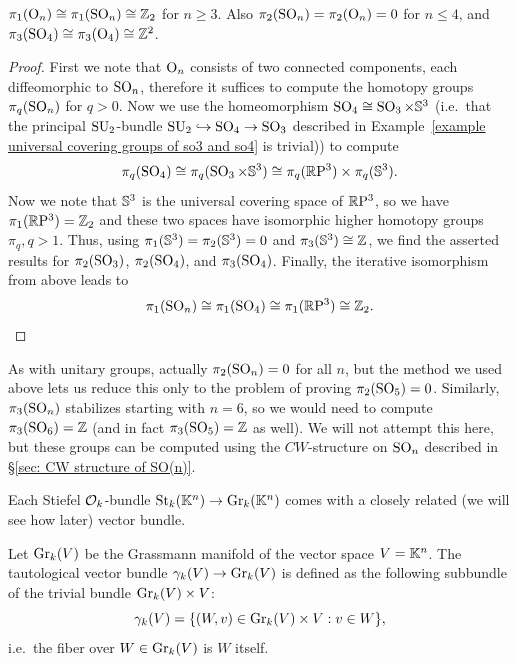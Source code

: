 \begin{cor}
    $\pi_1(\operatorname{O}_n)\cong \pi_1(\operatorname{SO}_n)\cong\mathbb{Z}_2$ for $n\geq 3$. Also $\pi_2(\operatorname{SO}_n)=\pi_2(\operatorname{O}_n)=0$ for $n\leq 4$, and $\pi_3(\operatorname{SO}_4)\cong\pi_3(\operatorname{O}_4)\cong\mathbb{Z}^2$.
\end{cor}
\begin{proof}
    First we note that $\operatorname{O}_n$ consists of two connected components, each diffeomorphic to $\operatorname{SO}_n$, therefore it suffices to compute the homotopy groups $\pi_q(\operatorname{SO}_n)$ for $q>0$. Now we use the homeomorphism $\operatorname{SO}_4\cong\operatorname{SO}_3\times \mathbb{S}^3$ (i.e.\ that the principal $\operatorname{SU}_2$-bundle $\operatorname{SU}_2\hookrightarrow \operatorname{SO}_4\to \operatorname{SO}_3$ described in Example~\ref{example universal covering groups of so3 and so4} is trivial)) to compute
    \[\pi_q(\operatorname{SO}_4)\cong \pi_q(\operatorname{SO}_3\times \mathbb{S}^3)\cong \pi_q(\mathbb{R}\mathrm{P}^3)\times \pi_q(\mathbb{S}^3).\]
    Now we note that $\mathbb{S}^3$ is the universal covering space of $\mathbb{R}\mathrm{P}^3$, so we have $\pi_1(\mathbb{R}\mathrm{P}^3)=\mathbb{Z}_2$ and these two spaces have isomorphic higher homotopy groups $\pi_q, q>1$. Thus, using $\pi_1(\mathbb{S}^3)=\pi_2(\mathbb{S}^3)=0$ and $\pi_3(\mathbb{S}^3)\cong \mathbb{Z}$, we find the asserted results for $\pi_2(\operatorname{SO}_3)$, $\pi_2(\operatorname{SO}_4)$, and $\pi_3(\operatorname{SO}_4)$. Finally, the iterative isomorphism from above leads to
    \[
        \pi_1(\operatorname{SO}_n)\cong \pi_1(\operatorname{SO}_4)\cong \pi_1(\mathbb{R}\mathrm{P}^3)\cong \mathbb{Z}_2.
    \]
\end{proof}
\begin{rem}
    As with unitary groups, actually $\pi_2(\operatorname{SO}_n)=0$ for all $n$, but the method we used above lets us reduce this only to the problem of proving $\pi_2(\operatorname{SO}_5)=0$. Similarly, $\pi_3(\operatorname{SO}_n)$ stabilizes starting with $n=6$, so we would need to compute $\pi_3(\operatorname{SO}_6)=\mathbb{Z}$ (and in fact $\pi_3(\operatorname{SO}_5)=\mathbb{Z}$ as well). We will not attempt this here, but these groups can be computed using the $CW$-structure on $\operatorname{SO}_n$ described in \S\ref{sec: CW structure of SO(n)}.
\end{rem}


Each Stiefel $\mathcal{O}_k$-bundle $\operatorname{St}_k(\mathbb{K}^n)\to \operatorname{Gr}_k(\mathbb{K}^n)$ comes with a closely related (we will see how later) vector bundle.

\begin{defn}
    Let $\operatorname{Gr}_k(V)$ be the Grassmann manifold of the vector space $V=\mathbb{K}^n$. The tautological vector bundle $\gamma_k(V)\to \operatorname{Gr}_k(V)$ is defined as the following subbundle of the trivial bundle $\operatorname{Gr}_k(V)\times V$:
    \[\gamma_k(V)=\{(W,v)\in \operatorname{Gr}_k(V)\times V: v\in W\},\]
    i.e.~the fiber over $W\in \operatorname{Gr}_k(V)$ is $W$ itself.
\end{defn}


